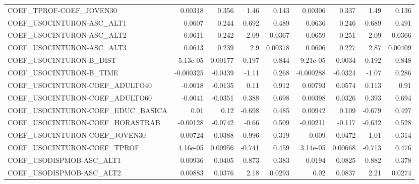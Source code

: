 \begin{tabular}{lrrrrrrrr}
COEF\_TPROF-COEF\_JOVEN30           &     0.00318 &        0.356 &    1.46 &    0.143 &    0.00306 &       0.337 &         1.49 &         0.136 \\
COEF\_USOCINTURON-ASC\_ALT1         &      0.0607 &        0.244 &   0.692 &    0.489 &     0.0636 &       0.246 &        0.689 &         0.491 \\
COEF\_USOCINTURON-ASC\_ALT2         &      0.0611 &        0.242 &    2.09 &   0.0367 &     0.0659 &       0.251 &         2.09 &        0.0366 \\
COEF\_USOCINTURON-ASC\_ALT3         &      0.0613 &        0.239 &     2.9 &  0.00378 &     0.0606 &       0.227 &         2.87 &       0.00409 \\
COEF\_USOCINTURON-B\_DIST           &    5.13e-05 &      0.00177 &   0.197 &    0.844 &   9.21e-05 &      0.0034 &        0.192 &         0.848 \\
COEF\_USOCINTURON-B\_TIME           &   -0.000325 &      -0.0439 &   -1.11 &    0.268 &  -0.000288 &     -0.0324 &        -1.07 &         0.286 \\
COEF\_USOCINTURON-COEF\_ADULTO40    &     -0.0018 &      -0.0135 &    0.11 &    0.912 &    0.00793 &      0.0574 &        0.113 &          0.91 \\
COEF\_USOCINTURON-COEF\_ADULTO60    &     -0.0041 &      -0.0351 &   0.388 &    0.698 &    0.00398 &      0.0326 &        0.393 &         0.694 \\
COEF\_USOCINTURON-COEF\_EDUC\_BASICA &        0.01 &         0.12 &  -0.698 &    0.485 &    0.00942 &       0.109 &       -0.679 &         0.497 \\
COEF\_USOCINTURON-COEF\_HORASTRAB   &    -0.00128 &      -0.0742 &   -0.66 &    0.509 &   -0.00211 &      -0.117 &       -0.632 &         0.528 \\
COEF\_USOCINTURON-COEF\_JOVEN30     &     0.00724 &       0.0388 &   0.996 &    0.319 &      0.009 &      0.0472 &         1.01 &         0.314 \\
COEF\_USOCINTURON-COEF\_TPROF       &    4.16e-05 &      0.00956 &  -0.741 &    0.459 &   3.14e-05 &     0.00668 &       -0.713 &         0.476 \\
COEF\_USODISPMOB-ASC\_ALT1          &     0.00936 &       0.0405 &   0.873 &    0.383 &     0.0194 &      0.0825 &        0.882 &         0.378 \\
COEF\_USODISPMOB-ASC\_ALT2          &     0.00883 &       0.0376 &    2.18 &   0.0293 &       0.02 &      0.0837 &         2.21 &        0.0274 \\

\end{tabular}
